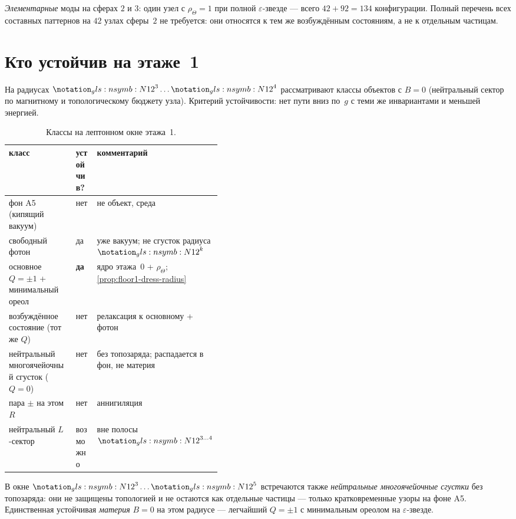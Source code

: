\emph{Элементарные} моды на сферах $2$ и $3$: один узел с $\rho_\Theta=1$
при полной $\varepsilon$-звезде --- всего $42+92=134$ конфигурации.
Полный перечень всех составных паттернов на $42$ узлах сферы~$2$ не требуется:
они относятся к тем же возбуждённым состояниям, а не к отдельным частицам.

\section{Кто устойчив на этаже~1}
\label{sec:floor1-census}

На радиусах $\geomNeighborTwelve^{3}\ldots \geomNeighborTwelve^{4}$ рассматривают классы объектов с $B=0$
(нейтральный сектор по магнитному и топологическому бюджету узла).
Критерий устойчивости: нет пути вниз по~$g$ с теми же инвариантами и меньшей энергией.

\begin{table}[htbp]
  \centering
  \caption{Классы на лептонном окне этажа~1.}
  \label{tab:floor1-census}
  \begin{tabular}{@{}llp{0.42\linewidth}@{}}
    \toprule
    класс & устойчив? & комментарий \\
    \midrule
    фон A5 (кипящий вакуум) & нет & не объект, среда \\
    свободный фотон & да & уже вакуум; не сгусток радиуса $\geomNeighborTwelve^{k}$ \\
    основное $Q=\pm1$ + минимальный ореол & \textbf{да} & ядро этажа~0 + $\rho_\Theta$; \cref{prop:floor1-dress-radius} \\
    возбуждённое состояние (тот же $Q$) & нет & релаксация к основному + фотон \\
    нейтральный многоячейочный сгусток ($Q=0$) & нет & без топозаряда; распадается в фон, не материя \\
    пара $\pm$ на этом $R$ & нет & аннигиляция \\
    нейтральный $L$-сектор & возможно & вне полосы $\geomNeighborTwelve^{3\ldots 4}$ \\
    \bottomrule
  \end{tabular}
\end{table}

В окне $\geomNeighborTwelve^{3}\ldots \geomNeighborTwelve^{5}$ встречаются также
\emph{нейтральные многоячейочные сгустки} без топозаряда: они не защищены топологией
и не остаются как отдельные частицы --- только кратковременные узоры на фоне A5.
Единственная устойчивая \emph{материя} $B=0$ на этом радиусе --- легчайший $Q=\pm1$
с минимальным ореолом на $\varepsilon$-звезде.

